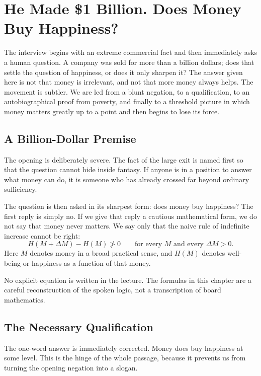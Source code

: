 \chapter{He Made \$1 Billion. Does Money Buy Happiness?}

The interview begins with an extreme commercial fact and then immediately asks a human question. A company was sold for more than a billion dollars; does that settle the question of happiness, or does it only sharpen it? The answer given here is not that money is irrelevant, and not that more money always helps. The movement is subtler. We are led from a blunt negation, to a qualification, to an autobiographical proof from poverty, and finally to a threshold picture in which money matters greatly up to a point and then begins to lose its force.

\section{A Billion-Dollar Premise}

The opening is deliberately severe. The fact of the large exit is named first so that the question cannot hide inside fantasy. If anyone is in a position to answer what money can do, it is someone who has already crossed far beyond ordinary sufficiency.

The question is then asked in its sharpest form: does money buy happiness? The first reply is simply no. If we give that reply a cautious mathematical form, we do not say that money never matters. We say only that the naive rule of indefinite increase cannot be right:
\begin{equation}
H(M+\Delta M)-H(M)\not>0
\qquad
\text{for every } M \text{ and every } \Delta M>0.
\end{equation}
Here \(M\) denotes money in a broad practical sense, and \(H(M)\) denotes well-being or happiness as a function of that money.

\begin{remark}
No explicit equation is written in the lecture. The formulas in this chapter are a careful reconstruction of the spoken logic, not a transcription of board mathematics.
\end{remark}

\section{The Necessary Qualification}

The one-word answer is immediately corrected. Money does buy happiness at some level. This is the hinge of the whole passage, because it prevents us from turning the opening negation into a slogan.

